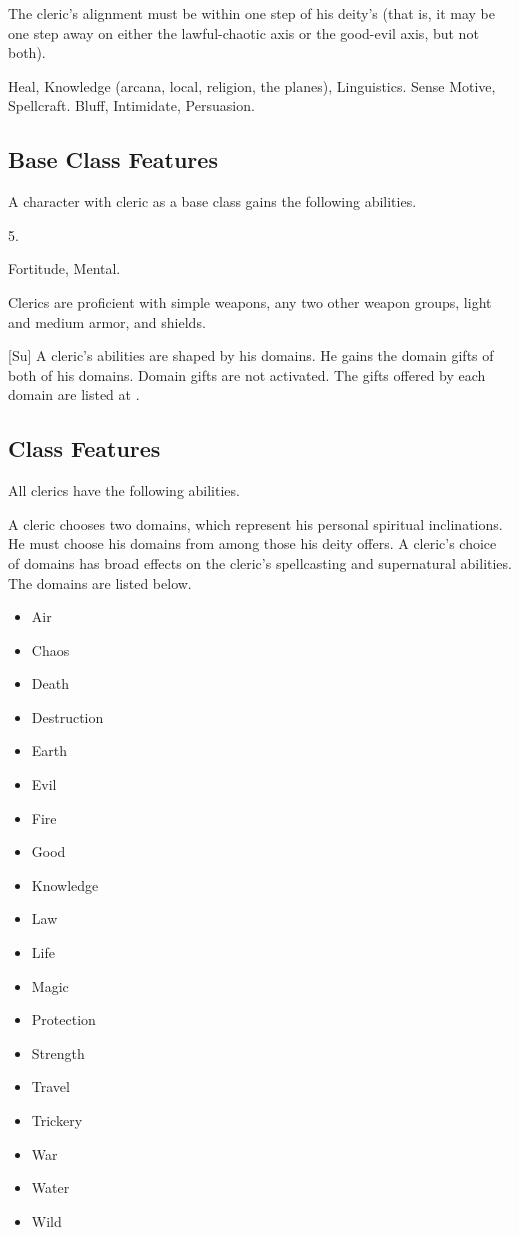  The cleric's alignment must be within one step of his deity's (that is, it may be one step away on either the lawful-chaotic axis or the good-evil axis, but not both).

 Heal, Knowledge (arcana, local, religion, the planes), Linguistics.
 Sense Motive, Spellcraft.
 Bluff, Intimidate, Persuasion.

\subsection{Base Class Features}
A character with cleric as a base class gains the following abilities.

 5.

  Fortitude,  Mental.

 Clerics are proficient with simple weapons, any two other weapon groups, light and medium armor, and shields.

[Su]
A cleric's abilities are shaped by his domains.
He gains the domain gifts of both of his domains.
Domain gifts are not activated.
The gifts offered by each domain are listed at .

\subsection{Class Features}
All clerics have the following abilities.

A cleric chooses two domains, which represent his personal spiritual inclinations.
He must choose his domains from among those his deity offers.
A cleric's choice of domains has broad effects on the cleric's spellcasting and supernatural abilities.
The domains are listed below.

\begin{itemize}
    \item{Air}
    \item{Chaos}
    \item{Death}
    \item{Destruction}
    \item{Earth}
    \item{Evil}
    \item{Fire}
    \item{Good}
    \item{Knowledge}
    \item{Law}
    \item{Life}
    \item{Magic}
    \item{Protection}
    \item{Strength}
    \item{Travel}
    \item{Trickery}
    \item{War}
    \item{Water}
    \item{Wild}
\end{itemize}

